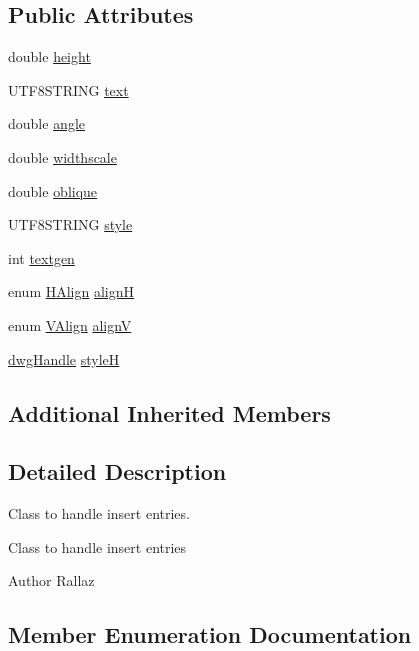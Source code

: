 \subsection*{Public Attributes}
\begin{DoxyCompactItemize}
\item 
double \hyperlink{class_d_r_w___text_ad38ec2dfef3ab3c4367423a0d4e49c05}{height}
\item 
U\+T\+F8\+S\+T\+R\+I\+N\+G \hyperlink{class_d_r_w___text_a87a40d4523371ee0cc250be0fc8834cd}{text}
\item 
double \hyperlink{class_d_r_w___text_aad647ab8b0086a18978dd0b291569e5b}{angle}
\item 
double \hyperlink{class_d_r_w___text_a17468f7c0e1bd0b1c6da87cc9300b7e1}{widthscale}
\item 
double \hyperlink{class_d_r_w___text_ab273757633e67aa82b17b6b1141c8b98}{oblique}
\item 
U\+T\+F8\+S\+T\+R\+I\+N\+G \hyperlink{class_d_r_w___text_a11fa7c1b5a6fccafe2991bad2413cfa8}{style}
\item 
int \hyperlink{class_d_r_w___text_ada45df3aae10844afc1861261e40869e}{textgen}
\item 
enum \hyperlink{class_d_r_w___text_a66511da21199b0ab967fa951bc339f2d}{H\+Align} \hyperlink{class_d_r_w___text_ace4ad466c2d13111f69b4413c279987e}{align\+H}
\item 
enum \hyperlink{class_d_r_w___text_a369c571137713ac08c5a5a9b66ff6c27}{V\+Align} \hyperlink{class_d_r_w___text_a1b3c6431eb7c016e3521a46dc24bd57e}{align\+V}
\item 
\hyperlink{classdwg_handle}{dwg\+Handle} \hyperlink{class_d_r_w___text_a2bbd98f55b08ef9d9d7011a32c6d94dd}{style\+H}
\end{DoxyCompactItemize}
\subsection*{Additional Inherited Members}


\subsection{Detailed Description}
Class to handle insert entries. 

Class to handle insert entries \begin{DoxyAuthor}{Author}
Rallaz 
\end{DoxyAuthor}


\subsection{Member Enumeration Documentation}
\hypertarget{class_d_r_w___text_a66511da21199b0ab967fa951bc339f2d}{}
